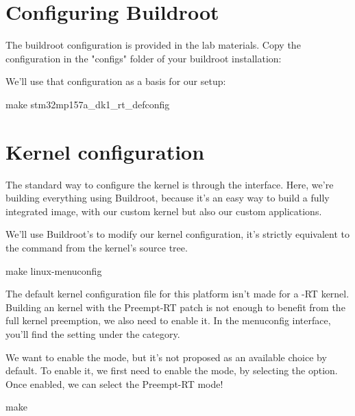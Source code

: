 \section{Configuring Buildroot}

The buildroot configuration is provided in the lab materials. Copy the configuration
in the "configs" folder of your buildroot installation:


We'll use that configuration as a basis for our setup:

\begin{bashinput}
make stm32mp157a_dk1_rt_defconfig
\end{bashinput}

\section{Kernel configuration}
The standard way to configure the kernel is through the  interface. Here, we're building everything using
Buildroot, because it's an easy way to build a fully integrated image, with our custom kernel but also our custom applications.

We'll use Buildroot's  to modify our kernel configuration,
it's strictly equivalent to the  command from the kernel's source tree.

\begin{bashinput}
	make linux-menuconfig
\end{bashinput}

The default kernel configuration file for this platform isn't made for a -RT kernel. Building an kernel with the Preempt-RT patch is not enough to
benefit from the full kernel preemption, we also need to enable it. In the menuconfig interface, you'll find the  setting under the  category.

We want to enable the  mode, but it's not proposed as an available choice by default. To enable it, we first need to enable the  mode, by selecting the  option. Once enabled, we can select the Preempt-RT mode!

\begin{bashinput}
make
\end{bashinput}

